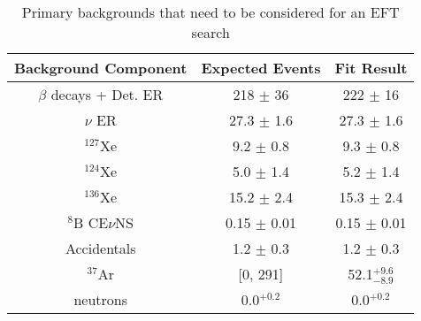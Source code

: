 


\begin{table}[]
    \centering
    \begin{tabular}{c|c|c}
        Background Component     & Expected Events    & Fit Result  \\ \hline
        $\beta$ decays + Det. ER & 218 $\pm$ 36       & 222 $\pm$ 16 \\
        $\nu$ ER                 & 27.3 $\pm$ 1.6     & 27.3 $\pm$ 1.6 \\
        ${}^{127}$Xe             & 9.2 $\pm$ 0.8      & 9.3 $\pm$ 0.8 \\
        ${}^{124}$Xe             & 5.0 $\pm$ 1.4      & 5.2 $\pm$ 1.4 \\
        ${}^{136}$Xe             & 15.2 $\pm$ 2.4     & 15.3 $\pm$ 2.4 \\
        ${}^{8}$B CE$\nu$NS      & 0.15 $\pm$ 0.01    & 0.15 $\pm$ 0.01 \\
        Accidentals              & 1.2 $\pm$ 0.3      & 1.2 $\pm$ 0.3 \\
        ${}^{37}$Ar              & [0, 291]           & 52.1${}^{+9.6}_{-8.9}$ \\
        neutrons                 & 0.0${}^{+0.2}$     & 0.0${}^{+0.2}$
    \end{tabular}
    \caption{Primary backgrounds that need to be considered for an EFT search}
    \label{tab:sr1_ws_lz_backgrounds}
\end{table}
